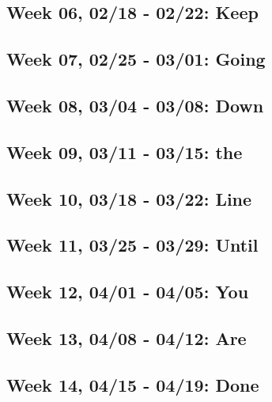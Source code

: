 \documentclass[11pt,]{article}
\begin{document}
\hypertarget{week-06-0218---0222-keep}{%
\subsection{Week 06, 02/18 - 02/22:
Keep}\label{week-06-0218---0222-keep}}

\hypertarget{week-07-0225---0301-going}{%
\subsection{Week 07, 02/25 - 03/01:
Going}\label{week-07-0225---0301-going}}

\hypertarget{week-08-0304---0308-down}{%
\subsection{Week 08, 03/04 - 03/08:
Down}\label{week-08-0304---0308-down}}

\hypertarget{week-09-0311---0315-the}{%
\subsection{Week 09, 03/11 - 03/15: the}\label{week-09-0311---0315-the}}

\hypertarget{week-10-0318---0322-line}{%
\subsection{Week 10, 03/18 - 03/22:
Line}\label{week-10-0318---0322-line}}

\hypertarget{week-11-0325---0329-until}{%
\subsection{Week 11, 03/25 - 03/29:
Until}\label{week-11-0325---0329-until}}

\hypertarget{week-12-0401---0405-you}{%
\subsection{Week 12, 04/01 - 04/05: You}\label{week-12-0401---0405-you}}

\hypertarget{week-13-0408---0412-are}{%
\subsection{Week 13, 04/08 - 04/12: Are}\label{week-13-0408---0412-are}}

\hypertarget{week-14-0415---0419-done}{%
\subsection{Week 14, 04/15 - 04/19:
Done}\label{week-14-0415---0419-done}}
\end{document}
